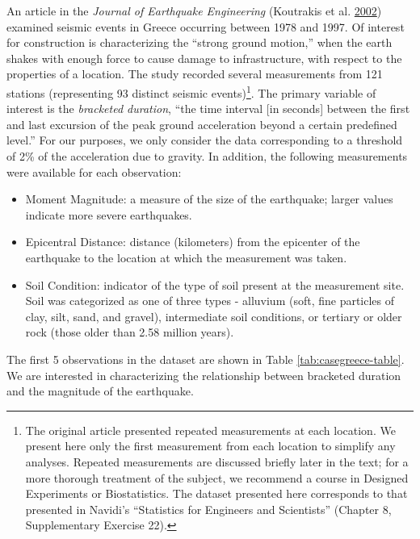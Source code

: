 \documentclass[]{book}
\providecommand{\tightlist}{%
  \setlength{\itemsep}{0pt}\setlength{\parskip}{0pt}}
\let\rmarkdownfootnote\footnote%
\def\footnote{\protect\rmarkdownfootnote}
\theoremstyle{definition}
\theoremstyle{definition}
\theoremstyle{definition}
\theoremstyle{remark}
\begin{document}
An article in the \emph{Journal of Earthquake Engineering} (Koutrakis et
al. \protect\hyperlink{ref-Koutrakis2002}{2002}) examined seismic events
in Greece occurring between 1978 and 1997. Of interest for construction
is characterizing the ``strong ground motion,'' when the earth shakes
with enough force to cause damage to infrastructure, with respect to the
properties of a location. The study recorded several measurements from
121 stations (representing 93 distinct seismic events)\footnote{The
  original article presented repeated measurements at each location. We
  present here only the first measurement from each location to simplify
  any analyses. Repeated measurements are discussed briefly later in the
  text; for a more thorough treatment of the subject, we recommend a
  course in Designed Experiments or Biostatistics. The dataset presented
  here corresponds to that presented in Navidi's ``Statistics for
  Engineers and Scientists'' (Chapter 8, Supplementary Exercise 22).}.
The primary variable of interest is the \emph{bracketed duration}, ``the
time interval {[}in seconds{]} between the first and last excursion of
the peak ground acceleration beyond a certain predefined level.'' For
our purposes, we only consider the data corresponding to a threshold of
2\% of the acceleration due to gravity. In addition, the following
measurements were available for each observation:

\begin{itemize}
\tightlist
\item
  Moment Magnitude: a measure of the size of the earthquake; larger
  values indicate more severe earthquakes.
\item
  Epicentral Distance: distance (kilometers) from the epicenter of the
  earthquake to the location at which the measurement was taken.
\item
  Soil Condition: indicator of the type of soil present at the
  measurement site. Soil was categorized as one of three types -
  alluvium (soft, fine particles of clay, silt, sand, and gravel),
  intermediate soil conditions, or tertiary or older rock (those older
  than 2.58 million years).
\end{itemize}

The first 5 observations in the dataset are shown in Table
\ref{tab:casegreece-table}. We are interested in characterizing the
relationship between bracketed duration and the magnitude of the
earthquake.
\end{document}
